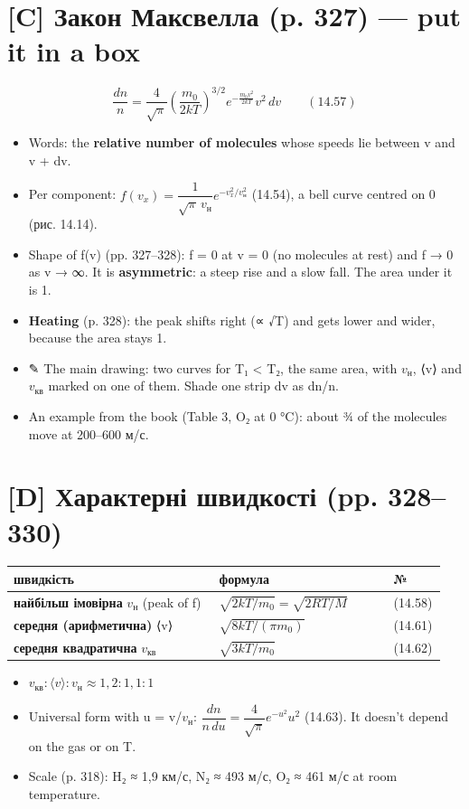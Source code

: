\documentclass[11pt,a4paper,oneside]{book}
\newcommand{\pen}{{\sffamily\color{accent}✎}}
\begin{document}
\section*{[C] Закон Максвелла (p. 327) — put it in a box}
\[\frac{dn}{n} = \frac{4}{\sqrt\pi}\left(\frac{m_0}{2kT}\right)^{3/2}e^{-\frac{m_0v^2}{2kT}}v^2\,dv\qquad(14.57)\]
\begin{itemize}
\item Words: the \textbf{relative number of molecules} whose speeds lie between v and v + dv.
\item Per component: $f(v_x) = \dfrac{1}{\sqrt\pi\,v_\text{н}}e^{-v_x^2/v_\text{н}^2}$ (14.54), a bell curve centred on 0 (рис. 14.14).
\item Shape of f(v) (pp. 327–328): f = 0 at v = 0 (no molecules at rest) and f → 0 as v → ∞. It is \textbf{asymmetric}: a steep rise and a slow fall. The area under it is 1.
\item \textbf{Heating} (p. 328): the peak shifts right (∝ √T) and gets lower and wider, because the area stays 1.
\item \pen{} The main drawing: two curves for T₁ < T₂, the same area, with $v_{\text{н}}$, ⟨v⟩ and $v_{\text{кв}}$ marked on one of them. Shade one strip dv as dn/n.
\item An example from the book (Table 3, O₂ at 0 °C): about ¾ of the molecules move at 200–600 м/с.
\end{itemize}

\section*{[D] Характерні швидкості (pp. 328–330)}
{\small
\begin{longtable}{>{\raggedright\arraybackslash}p{0.468\linewidth}>{\raggedright\arraybackslash}p{0.393\linewidth}>{\raggedright\arraybackslash}p{0.091\linewidth}}
\toprule
\textbf{швидкість} & \textbf{формула} & \textbf{№} \\
\midrule
\endhead
\textbf{найбільш імовірна} $v_{\text{н}}$ (peak of f) & $\sqrt{2kT/m_0} = \sqrt{2RT/M}$ & (14.58) \\
\textbf{середня (арифметична)} ⟨v⟩ & $\sqrt{8kT/(\pi m_0)}$ & (14.61) \\
\textbf{середня квадратична} $v_{\text{кв}}$ & $\sqrt{3kT/m_0}$ & (14.62) \\
\bottomrule
\end{longtable}
}
\begin{itemize}
\item $v_{\text{кв}} : \langle v\rangle : v_\text{н} \approx 1{,}2 : 1{,}1 : 1$
\item Universal form with u = v/$v_{\text{н}}$: $\dfrac{dn}{n\,du} = \dfrac4{\sqrt\pi}e^{-u^2}u^2$ (14.63). It doesn't depend on the gas or on T.
\item Scale (p. 318): H₂ ≈ 1,9 км/с, N₂ ≈ 493 м/с, O₂ ≈ 461 м/с at room temperature.
\end{itemize}
\end{document}
